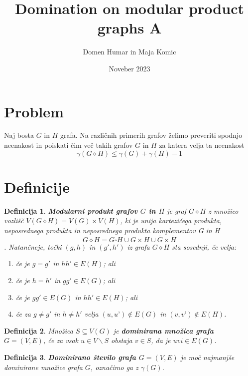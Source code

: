 \documentclass[a4paper,12pt]{article}
\newtheorem{definition}{Definicija}
\begin{document}
\author{Domen Humar in Maja Komic}
\date{Noveber 2023}
\title{Domination on modular product graphs  A}
\maketitle

\section{Problem}
Naj bosta $G$ in $H$ grafa. Na različnih primerih grafov želimo preveriti 
spodnjo neenakost in poiskati čim več takih grafov $G$ in $H$ za katera velja ta neenakost 
\begin{equation}
    \gamma(G\diamond H) \leq \gamma (G) + \gamma (H) - 1
\end{equation}

\section{Definicije}

    \begin{definition}
        \textbf {Modularni produkt grafov $G$ in $H$} je graf $G\diamond H$ z množico vozlišč $V( G\diamond H) = V(G) \times  V(H)$, ki je 
        unija kartezičega produkta, neposrednega produkta in neposrednega produkta komplementov G in H
        $$G \diamond H = G\square H \cup G \times H \cup \overline{G} \times \overline{H} $$.
        Natančneje, točki $(g, h)$ in $(g', h')$ iz grafa $G \diamond H$ sta sosednji, če velja: 
        \begin{enumerate}
            \item če je $g = g'$ in $hh' \in E(H)$; ali 
            \item če je $h = h'$ in $gg' \in E(G)$; ali 
            \item če je $gg' \in E(G)$ in $hh' \in E(H)$; ali
            \item če za $g \neq g'$ in $h \neq h'$ velja $(u, u’) \notin  E(G)$ in $(v, v’) \notin  E(H)$. 
        \end{enumerate}
    \end{definition}

    \begin{definition}
        Množica $S\subseteq V(G)$ je \textbf {dominirana množica grafa $G = (V,E)$}, če za vsak $u \in V \backslash S$ obstaja $v \in S$, da je $uv i\in E(G)$. 
    \end{definition}

    \begin{definition}
        \textbf {Dominirano število grafa $G = (V, E)$} je moč najmanjše dominirane množice grafa $G$, označimo ga z $\gamma (G)$.
    \end{definition}
\end{document}
